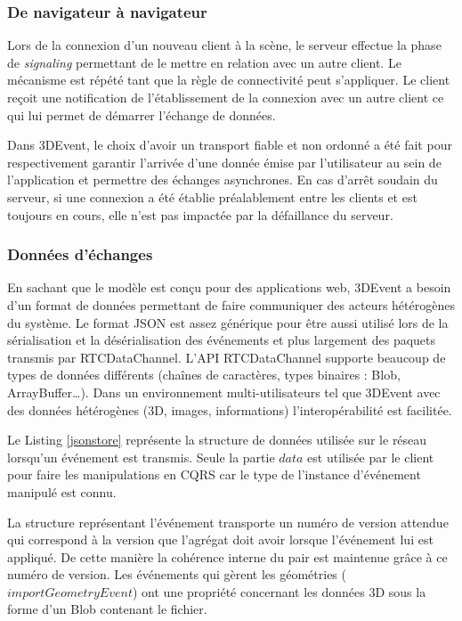 \subsubsection{De navigateur à navigateur}
Lors de la connexion d'un nouveau client à la scène, le serveur effectue la phase 
de \textit{signaling} permettant de le mettre en relation avec un autre client. Le 
mécanisme est répété tant que la règle de connectivité peut s'appliquer. Le client 
reçoit une notification de l'établissement de la connexion avec un autre client ce 
qui lui permet de démarrer l'échange de données.

Dans 3DEvent, le choix d'avoir un transport fiable et non ordonné a été fait pour 
respectivement garantir l'arrivée d'une donnée émise par l'utilisateur au sein de 
l'application et permettre des échanges asynchrones.
En cas d'arrêt soudain du serveur, si une connexion a été établie préalablement 
entre les clients et est toujours en cours, elle n'est pas impactée par la défaillance 
du serveur.
\subsubsection{Données d'échanges}

En sachant que le modèle est conçu pour des applications web, 3DEvent a besoin 
d'un format de données permettant de faire communiquer des acteurs hétérogènes 
du système.
Le format \gls{JSON} est assez générique pour être aussi utilisé lors de la 
sérialisation et la désérialisation des 
événements et plus largement des paquets transmis par RTCDataChannel. 
L'\acrshort{API} RTCDataChannel supporte beaucoup de types de données 
différents (chaînes de caractères, types binaires : Blob, ArrayBuffer\dots). Dans 
un environnement multi-utilisateurs tel que 3DEvent avec des données 
hétérogènes (3D, images, 
informations) l'interopérabilité est facilitée.

Le Listing  \ref{jsonstore} représente la structure de données utilisée sur le réseau 
lorsqu'un événement est transmis. Seule la partie $data$ est utilisée par le client
pour faire les manipulations en \gls{CQRS} car le type de l'instance d'événement 
manipulé est connu. 

La structure représentant l'événement transporte un numéro de version \og 
attendue\fg{} 
qui correspond à la version que l'agrégat doit avoir lorsque l'événement lui est 
appliqué. De cette manière la cohérence interne du pair est maintenue grâce à ce 
numéro de version.
Les événements qui gèrent les géométries ($importGeometryEvent$) ont une 
propriété concernant les données 3D sous la forme d'un Blob contenant le fichier. 

